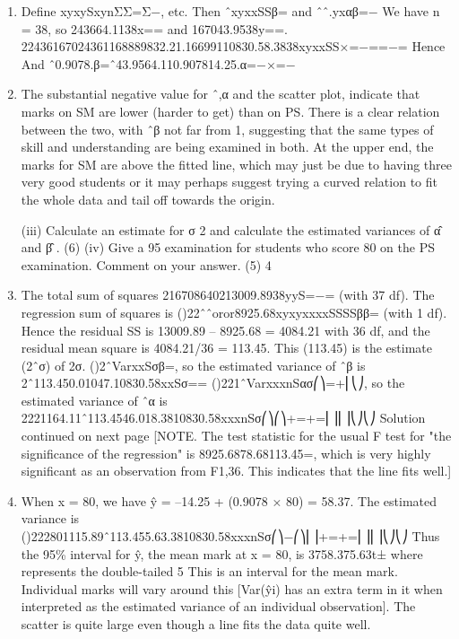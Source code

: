 \documentclass[a4paper,12pt]{article}
\begin{document}
\begin{enumerate}
\item Define xyxySxynΣΣ=Σ−, etc. Then ˆxyxxSSβ= and ˆˆ.yxαβ=−
We have n = 38, so 243664.1138x== and 167043.9538y==.
22436167024361168889832.21.16699110830.58.3838xyxxSS×=−==−=
Hence And ˆ0.9078.β=ˆ43.9564.110.907814.25.α=−×=−
\item The substantial negative value for ˆ,α and the scatter plot, indicate that marks on SM are lower (harder to get) than on PS. There is a clear relation between the two, with ˆβ not far from 1, suggesting that the same types of skill and understanding are being examined in both.
At the upper end, the marks for SM are above the fitted line, which may just be due to having three very good students or it may perhaps suggest trying a curved relation to fit the whole data and tail off towards the origin.

\newpage

\begin{framed}
(iii) Calculate an estimate for σ 2 and calculate the estimated variances of α̂ and β̂ .
(6)
(iv) Give a 95%
examination for students who score 80 on the PS examination. Comment on
your answer.
(5)
4
\end{framed}
\item The total sum of squares 216708640213009.8938yyS=−= (with 37 df).
The regression sum of squares is ()22ˆˆoror8925.68xyxyxxxxSSSSββ= (with 1 df).
Hence the residual SS is 13009.89 – 8925.68 = 4084.21 with 36 df, and the residual mean square is 4084.21/36 = 113.45.
This (113.45) is the estimate (2ˆσ) of 2σ.
()2ˆVarxxSσβ=, so the estimated variance of ˆβ is 2ˆ113.450.01047.10830.58xxSσ==
()221ˆVarxxxnSασ⎛⎞=+⎜⎝⎠, so the estimated variance of ˆα is
2221164.11ˆ113.4546.018.3810830.58xxxnSσ⎛⎞⎛⎞+=+=⎜⎟⎜⎟⎝⎠⎝⎠
Solution continued on next page
[NOTE. The test statistic for the usual F test for "the significance of the regression" is 8925.6878.68113.45=, which is very highly significant as an observation from F1,36.
This indicates that the line fits well.]
\item When x = 80, we have ŷ = –14.25 + (0.9078 × 80) = 58.37.
The estimated variance is ()222801115.89ˆ113.455.63.3810830.58xxxnSσ⎛⎞−⎛⎞⎜⎟+=+=⎜⎟⎜⎟⎝⎠⎝⎠
Thus the 95\% interval for ŷ, the mean mark at x = 80, is 3758.375.63t± where represents the double-tailed 5%
This is an interval for the mean mark. Individual marks will vary around this [Var(ŷi) has an extra term in it when interpreted as the estimated variance of an individual observation]. The scatter is quite large even though a line fits the data quite well.
\end{enumerate}
\end{document}
